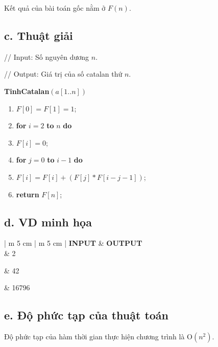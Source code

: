 \documentclass[12pt, a4paper, fleqn]{article}
\begin{document}
	Kết quả của bài toán gốc nằm ở $F(n)$.
	
	\subsection*{c. Thuật giải}
	
	// Input: Số nguyên dương $n$.
	
	// Output: Giá trị của số catalan thứ $n$.
	
	\textbf{TinhCatalan}$(a[1..n])$
	\begin{enumerate}
		\item $F[0] = F[1] = 1$;
		\item \textbf{for} $i = 2$ \textbf{to} $n$ \textbf{do}
		\item \qquad $F[i] = 0$;
		\item \qquad \textbf{for} $j = 0$ \textbf{to} $i - 1$ \textbf{do}
		\item \qquad \qquad $F[i] = F[i] + (F[j] * F[i - j - 1])$;
		\item \textbf{return} $F[n]$;
	\end{enumerate}
	
	\subsection*{d. VD minh họa}
	
	{ \selectfont
		\begin{center}
			\begin{tabular}{ | m {5 cm} | m {5 cm} | } 
				\hline
				\textbf{INPUT} & \textbf{OUTPUT} \\
				 & 2 \\
				\hline
				
				 & 42 \\
				\hline
				
				 & 16796 \\
				\hline
				
			\end{tabular}
		\end{center}
	}
	
	\subsection*{e. Độ phức tạp của thuật toán}
	
	Độ phức tạp của hàm thời gian thực hiện chương trình là O$(n^2)$.
	
	\clearpage
\end{document}
